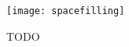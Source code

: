 \begin{figure}[t]
\begin{center}
\texttt{[image: spacefilling]}
\caption{
TODO
}
\label{fig:spacefilling}
\end{center}
\end{figure}
